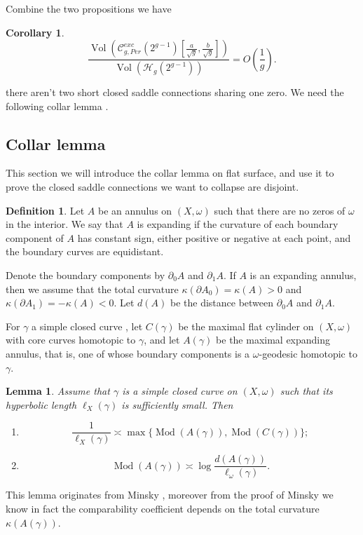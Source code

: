 \documentclass[12pt]{amsart} %
\newtheorem{lemma}[theorem]{Lemma}
\newtheorem{corollary}[theorem]{Corollary}
\theoremstyle{definition}
\newtheorem{definition}[theorem]{Definition}
\theoremstyle{remark}
\numberwithin{equation}{section}
\renewcommand\H{{\mathcal H}}
\newcommand{\V}{\operatorname{Vol}}
\begin{document}
Combine the two propositions we have
\begin{corollary}
$$\frac{\V(\mathcal{C}^{exc}_{g,Per}(2^{g-1})[\frac{a}{\sqrt{g}},\frac{b}{\sqrt{g}}])}{\V(\H_g(2^{g-1}))}=O(\frac{1}{g}).$$
\end{corollary}



\iffalse
there aren't two short closed saddle
connections sharing one zero. We need the following collar lemma \cite{minsky1992harmonic,choi2008lines,lenzhen2010criteria}.


\subsection{Collar lemma}
This section we will introduce the collar lemma on flat surface, and use it to prove the closed saddle connections we want to collapse are disjoint.
\begin{definition}
    Let $A$ be an annulus on $(X,\omega)$ such that there are no zeros of $\omega$ in the interior.
   We say that $A$ is expanding if the curvature of each boundary component of $A$ has constant sign, either positive or
negative at each point, and the boundary curves are equidistant.
\end{definition}
Denote the boundary components by $\partial_0 A$ and $\partial_1 A$. 
If $A$ is an expanding annulus, then we assume that the total curvature $\kappa(\partial A_0)= \kappa(A)> 0$ and $\kappa(\partial A_1)= -\kappa(A) < 0$. 
Let $d(A)$ be the distance between $\partial_0 A$ and $\partial_1 A$.

For $\gamma$ a simple closed curve , let $C(\gamma)$ be the maximal flat cylinder on
$(X,\omega)$ with core curves homotopic to $\gamma$, and let $A(\gamma)$ be the maximal expanding annulus, 
that is, one of whose boundary components is a $\omega$-geodesic homotopic to $\gamma$. 
  

\begin{lemma}\cite[Lemma 1]{lenzhen2010criteria}\label{lem:annulus}
  Assume that $\gamma$ is a simple closed curve on $(X,\omega)$ such that its hyperbolic length $\ell_X(\gamma)$ is sufficiently small. Then  
  \begin{enumerate}
      \item[(1)]  $$\frac{1}{\ell_X(\gamma)} \asymp \max\{ \operatorname{Mod}(A(\gamma)), \operatorname{Mod}(C(\gamma))\};$$
      \item[(2)] $$\operatorname{Mod}(A(\gamma)) \asymp \log \frac{d(A(\gamma))}{\ell_\omega(\gamma)}.$$
  \end{enumerate}
\end{lemma}
This lemma originates from Minsky \cite[\S 4.3]{minsky1992harmonic}, moreover from the proof of Minsky we know in fact the comparability coefficient depends on the
total curvature $\kappa(A(\gamma))$.
\end{document}

